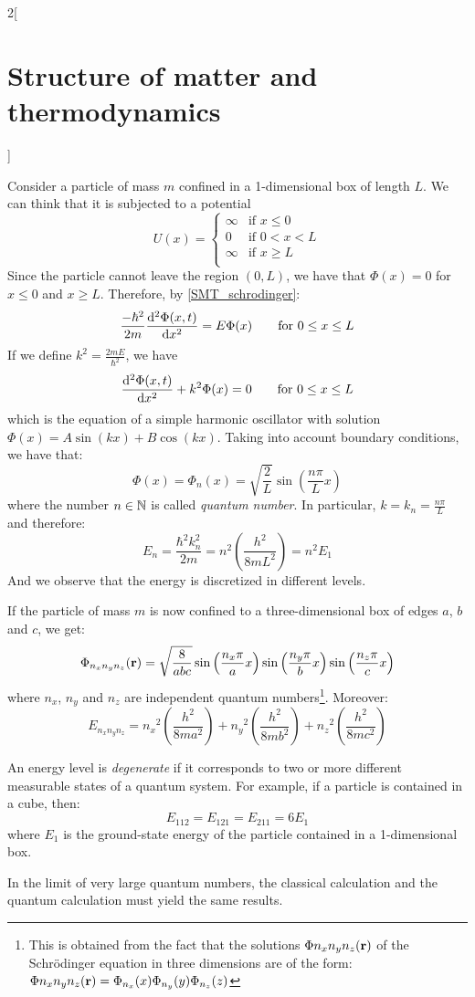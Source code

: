 \documentclass[../../../main.tex]{subfiles}
\begin{document}
\begin{multicols}{2}[\section{Structure of matter and thermodynamics}]
\begin{definition}
  \end{definition}
  \begin{proposition}
    Consider a particle of mass $m$ confined in a 1-dimensional box of length $L$. We can think that it is subjected to a potential $$U(x)=
      \begin{cases}
        \infty & \text{if }x\leq 0   \\
        0      & \text{if }0 < x < L \\
        \infty & \text{if }x\geq L   \\
      \end{cases}
    $$
    Since the particle cannot leave the region $(0,L)$, we have that $\Phi(x)=0$ for $x\leq 0$ and $x\geq L$. Therefore, by \cref{SMT_schrodinger}:
    $$
      \frac{-\hbar^2}{2m}\dv[2]{\Phi(x,t)}{x}=E\Phi(x)\qquad\text{for }0\leq x\leq L
    $$
    If we define $k^2=\frac{2m E}{\hbar^2}$, we have
    $$
      \dv[2]{\Phi(x,t)}{x}+k^2\Phi(x)=0\qquad\text{for }0\leq x\leq L
    $$
    which is the equation of a simple harmonic oscillator with solution $\Phi(x)=A\sin(kx)+B\cos(kx)$. Taking into account boundary conditions, we have that: $$\Phi(x)=\Phi_n(x)=\sqrt{\frac{2}{L}}\sin\left(\frac{n\pi}{L}x\right)$$ where the number $n\in\mathbb{N}$ is called \emph{quantum number}. In particular, $k=k_n=\frac{n\pi}{L}$ and therefore: $$E_n=\frac{\hbar^2k_n^2}{2m}=n^2\left(\frac{h^2}{8mL^2}\right)=n^2E_1$$ And we observe that the energy is discretized in different levels.
  \end{proposition}
  \begin{proposition}
    If the particle of mass $m$ is now confined to a three-dimensional box of edges $a$, $b$ and $c$, we get:
    $$\Phi_{n_xn_yn_z}(\boldsymbol{\mathrm{r}})=\sqrt{\frac{8}{abc}}\sin\left(\frac{n_x\pi}{a}x\right)\sin\left(\frac{n_y\pi}{b}x\right)\sin\left(\frac{n_z\pi}{c}x\right)$$
    where $n_x$, $n_y$ and $n_z$ are independent quantum numbers\footnote{This is obtained from the fact that the solutions $\Phi{n_xn_yn_z}(\boldsymbol{\mathrm{r}})$ of the Schrödinger equation in three dimensions are of the form: $\Phi{n_xn_yn_z}(\boldsymbol{\mathrm{r}})=\Phi_{n_x}(x)\Phi_{n_y}(y)\Phi_{n_z}(z)$}. Moreover:
    $$E_{n_xn_yn_z}={n_x}^2\left(\frac{h^2}{8ma^2}\right)+{n_y}^2\left(\frac{h^2}{8mb^2}\right)+{n_z}^2\left(\frac{h^2}{8mc^2}\right)$$
  \end{proposition}
  \begin{definition}
    An energy level is \emph{degenerate} if it corresponds to two or more different measurable states of a quantum system. For example, if a particle is contained in a cube, then: $$E_{112}=E_{121}=E_{211}=6E_1$$ where $E_1$ is the ground-state energy of the particle contained in a 1-dimensional box.
  \end{definition}
  \begin{proposition}
    In the limit of very large quantum numbers, the classical calculation and the quantum calculation must yield the same results.
  \end{proposition}

\end{multicols}
\end{document}
